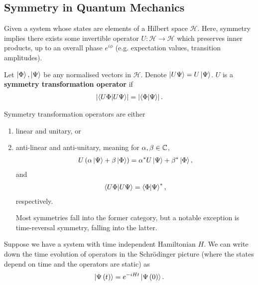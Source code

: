 \subsection{Symmetry in Quantum Mechanics}

Given a system whose states are elements of a Hilbert space $\mathcal{H}$. Here, symmetry implies there exists some invertible operator $U : \mathcal{H} \to \mathcal{H}$ which preserves inner products, up to an overall phase $e^{i\phi}$ (e.g. expectation values, transition amplitudes).

\begin{definition}
    Let $\ket{\Phi}, \ket{\Psi}$ be any normalised vectors in $\mathcal{H}$. Denote $\ket{U \Psi} = U \ket{\Psi}$. $U$ is a \textbf{symmetry transformation operator} if
    \begin{align}
        \left| \bra{U \Phi} \ket{U \Psi} \right|  = \left| \bra{\Phi} \ket{\Psi} \right| 
    .\end{align}
\end{definition}

\begin{proposition}
    Symmetry transformation operators are either
    \begin{enumerate}[label=\alph*)]
        \item linear and unitary, or
        \item anti-linear and anti-unitary, meaning for $\alpha, \beta \in \mathbb{C}$,
            \begin{align}
                U \left( \alpha \ket{\Psi} + \beta \ket{\Phi} \right) = \alpha^{*} U \ket{\Psi} + \beta^{*} \ket{\Phi}
            ,\end{align}
            and
            \begin{align}
                \bra{U \Phi} \ket{U \Psi} = \bra{\Phi} \ket{\Psi}^{*}
            ,\end{align}
            respectively. 

            Most symmetries fall into the former category, but a notable exception is time-reversal symmetry, falling into the latter.
    \end{enumerate}
    
\end{proposition}

Suppose we have a system with time independent Hamiltonian $H$. We can write down the time evolution of operators in the Schrödinger picture (where the states depend on time and the operators are static) as
\begin{align}
    \ket{\Psi \left( t \right)} = e^{-i H t} \ket{\Psi \left( 0 \right)}
.\end{align}


